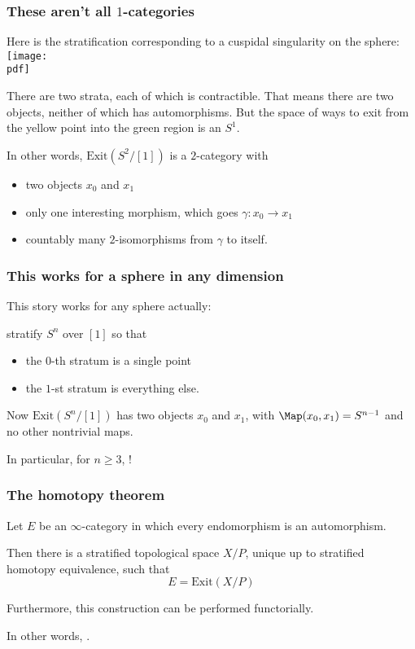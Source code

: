 \documentclass[11pt,xcolor={dvipsnames},hyperref={pdftex,pdfpagemode=UseNone,hidelinks,pdfdisplaydoctitle=true},usepdftitle=false]{beamer}
\newcommand{\Exit}{\text{Exit}}
\newcommand{\pdf}{figures.pdf}
\begin{document}
\begin{frame}
  \frametitle{These aren't all $1$-categories}
    Here is the stratification corresponding to a cuspidal singularity on the sphere:
    \texttt{[image: \\pdf]}

    There are two strata, each of which is contractible.
    That means there are two objects, neither of which has automorphisms.
    But the space of ways to exit from the yellow point into the green region is an $S^1$.

    In other words, $\Exit(S^2/[1])$ is a $2$-category with
    \begin{itemize}
      \item two objects $x_0$ and $x_1$
      \item only one interesting morphism, which goes $\gamma \colon x_0 \to x_1$
      \item countably many $2$-isomorphisms from $\gamma$ to itself.
    \end{itemize}
\end{frame}

\begin{frame}
  \frametitle{This works for a sphere in any dimension}
  This story works for any sphere actually:

  stratify $S^n$ over $[1]$ so that
  \begin{itemize}
    \item the $0$-th stratum is a single point
    \item the $1$-st stratum is everything else.
  \end{itemize}
  Now $\Exit(S^n/[1])$ has two objects $x_0$ and $x_1$,
  with $\Map(x_0, x_1) = S^{n-1}$ and no other nontrivial maps.

  In particular, for $n \geq 3$,
  !
\end{frame}

\begin{frame}
  \frametitle{The homotopy theorem}
  \begin{theorem}
    Let $E$ be an $\infty$-category in which every endomorphism is an automorphism.

    Then there is a stratified topological space $X/P$, unique up to stratified homotopy equivalence,
    such that
    \[
      E = \Exit(X/P) 
    \]

    Furthermore, this construction can be performed functorially.
  \end{theorem}
  In other words, .
\end{frame}
\end{document}
